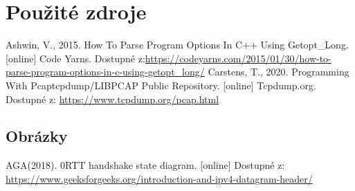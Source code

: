 \documentclass[a4paper, 12pt, titlepage]{article}
\begin{document}
\newpage
\section{Použité zdroje}
\begin{thebibliography}{99}
 Ashwin, V., 2015. How To Parse Program Options In C++ Using Getopt\_Long. [online] Code Yarns. Dostupné z:\url{https://codeyarns.com/2015/01/30/how-to-parse-program-options-in-c-using-getopt\_long/}
 Carstens, T., 2020. Programming With Pcaptcpdump/LIBPCAP Public Repository. [online] Tcpdump.org. Dostupné z: \url{https://www.tcpdump.org/pcap.html}

\end{thebibliography}

\subsection{Obrázky}
\begin{thebibliography}{99}
 AGA(2018). 0RTT handshake state diagram. [online] Dostupné z: \url{https://www.geeksforgeeks.org/introduction-and-ipv4-datagram-header/}
\end{thebibliography}
\end{document}
